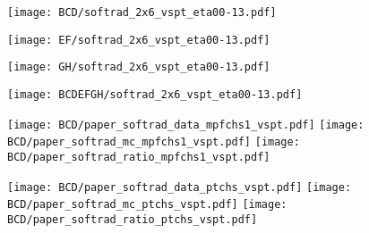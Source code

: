 \documentclass[landscape,10pt]{beamer} %
\newcommand{\commentout}[1]{}
\begin{document}
\commentout{
\newpage

\begin{figure}[p]
\centering
\texttt{[image: drawBCDEFvsGH\_mpfchs1\_ptchs.pdf]}
\texttt{[image: drawEFvsBCD\_mpfchs1\_ptchs.pdf]}
\texttt{[image: drawHvsG\_mpfchs1\_ptchs.pdf]}\\
\texttt{[image: drawBCDEFvsGH\_mpfchs1\_ptchs\_nogjmpf\_mjvsjes.pdf]}
\texttt{[image: drawEFvsBCD\_mpfchs1\_ptchs\_nogjmpf.pdf]}
\texttt{[image: drawHvsG\_mpfchs1\_ptchs\_nogjmpf.pdf]}
\end{figure}
} %

\newpage

\begin{figure}[p]
\centering
  \texttt{[image: BCD/softrad\_2x6\_vspt\_eta00-13.pdf]}
\end{figure}

\newpage

\begin{figure}[p]
\centering
  \texttt{[image: EF/softrad\_2x6\_vspt\_eta00-13.pdf]}
\end{figure}

\newpage

\begin{figure}[p]
\centering
  \texttt{[image: GH/softrad\_2x6\_vspt\_eta00-13.pdf]}
\end{figure}

\newpage

\begin{figure}[p]
\centering
  \texttt{[image: BCDEFGH/softrad\_2x6\_vspt\_eta00-13.pdf]}
\end{figure}

\newpage

\begin{figure}[p]
\centering
  \texttt{[image: BCD/paper\_softrad\_data\_mpfchs1\_vspt.pdf]}
  \texttt{[image: BCD/paper\_softrad\_mc\_mpfchs1\_vspt.pdf]}
  \texttt{[image: BCD/paper\_softrad\_ratio\_mpfchs1\_vspt.pdf]}
\end{figure}

\begin{figure}[p]
\centering
  \texttt{[image: BCD/paper\_softrad\_data\_ptchs\_vspt.pdf]}
  \texttt{[image: BCD/paper\_softrad\_mc\_ptchs\_vspt.pdf]}
  \texttt{[image: BCD/paper\_softrad\_ratio\_ptchs\_vspt.pdf]}
\end{figure}
\end{document}
